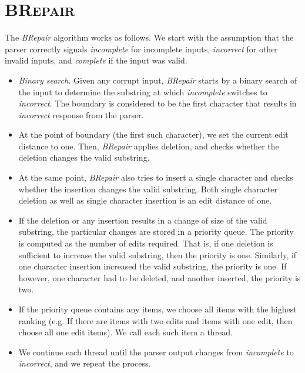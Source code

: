 \documentclass[sigconf,review,anonymous]{acmart}
\newcommand{\approach}{\textsc{BRepair}\xspace}
\newcommand{\brepair}{\textit{BRepair}\xspace}
\begin{document}
\section{\approach}
\label{sec:brepair}
The \brepair algorithm works as follows.
We start with the assumption that the parser correctly signals
\emph{incomplete} for incomplete inputs, \emph{incorrect} for other invalid
inputs, and \emph{complete} if the input was valid.
\begin{itemize}
\item \emph{Binary search.} Given any corrupt input, \brepair starts by a
binary search of the input to determine the substring at which \emph{incomplete}
switches to \emph{incorrect}. The boundary is considered to be the first
character that results in \emph{incorrect} response from the parser.

\item At the point of boundary (the first such character), we set the current
edit distance to one. Then, \brepair applies
deletion, and checks whether the deletion changes the valid substring.

\item At the same point, \brepair also tries to insert a single character and
checks whether the insertion changes the valid substring. Both single character
deletion as well as single character insertion is an edit distance of one.

\item If the deletion or any insertion results in a change of size of the valid
substring, the particular changes are stored in a priority queue.
The priority is computed as the number of edits required. That is, if one
deletion is sufficient to increase the valid substring, then the priority is
one. Similarly, if one character insertion increased the valid substring, the
priority is one. If however, one character had to be deleted, and another
inserted, the priority is two.

\item If the priority queue contains any items, we choose all items with the
highest ranking (e.g. If there are items with two edits and items with one
edit, then choose all one edit items). We call each such item a thread.

\item We continue each thread until the parser output changes from
\emph{incomplete} to \emph{incorrect}, and we repeat the process.


\end{itemize}
\end{document}
